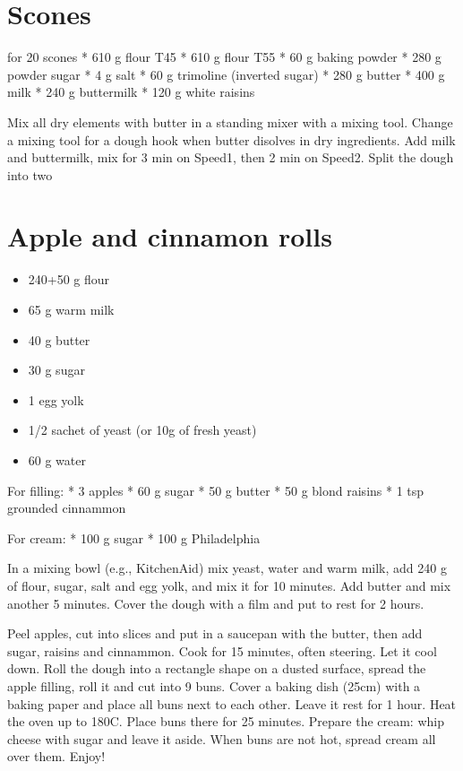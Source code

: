 \documentclass[
]{book}
\providecommand{\tightlist}{%
  \setlength{\itemsep}{0pt}\setlength{\parskip}{0pt}}
\begin{document}
\hypertarget{scones}{%
\section{Scones}\label{scones}}

for 20 scones
* 610 g flour T45
* 610 g flour T55
* 60 g baking powder
* 280 g powder sugar
* 4 g salt
* 60 g trimoline (inverted sugar)
* 280 g butter
* 400 g milk
* 240 g buttermilk
* 120 g white raisins

Mix all dry elements with butter in a standing mixer with a mixing tool.
Change a mixing tool for a dough hook when butter disolves in dry ingredients. Add milk and buttermilk, mix for 3 min on Speed1, then 2 min on Speed2.
Split the dough into two

\hypertarget{apple-and-cinnamon-rolls}{%
\section{Apple and cinnamon rolls}\label{apple-and-cinnamon-rolls}}

\begin{itemize}
\tightlist
\item
  240+50 g flour
\item
  65 g warm milk
\item
  40 g butter
\item
  30 g sugar
\item
  1 egg yolk
\item
  1/2 sachet of yeast (or 10g of fresh yeast)
\item
  60 g water
\end{itemize}

For filling:
* 3 apples
* 60 g sugar
* 50 g butter
* 50 g blond raisins
* 1 tsp grounded cinnammon

For cream:
* 100 g sugar
* 100 g Philadelphia

In a mixing bowl (e.g., KitchenAid) mix yeast, water and warm milk, add 240 g of flour, sugar, salt and egg yolk, and mix it for 10 minutes. Add butter and mix another 5 minutes. Cover the dough with a film and put to rest for 2 hours.

Peel apples, cut into slices and put in a saucepan with the butter, then add sugar, raisins and cinnammon. Cook for 15 minutes, often steering. Let it cool down.
Roll the dough into a rectangle shape on a dusted surface, spread the apple filling, roll it and cut into 9 buns. Cover a baking dish (25cm) with a baking paper and place all buns next to each other. Leave it rest for 1 hour.
Heat the oven up to 180C. Place buns there for 25 minutes.
Prepare the cream: whip cheese with sugar and leave it aside.
When buns are not hot, spread cream all over them. Enjoy!
\end{document}
